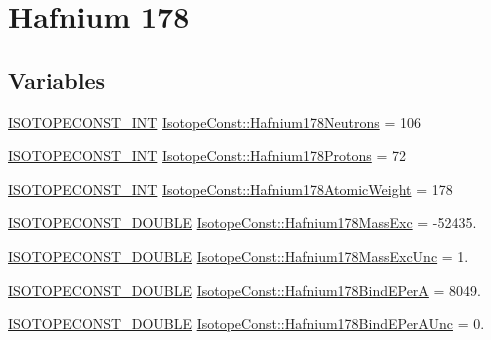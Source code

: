 \hypertarget{group___isotope_const-_hafnium-_hf178}{}\section{Hafnium 178}
\label{group___isotope_const-_hafnium-_hf178}
\subsection*{Variables}
\begin{DoxyCompactItemize}
\item 
\mbox{\hyperlink{group___isotope_const-_macros_ga5f18360b3e99483a35c32d789e62621c}{I\+S\+O\+T\+O\+P\+E\+C\+O\+N\+S\+T\+\_\+\+I\+NT}} \mbox{\hyperlink{group___isotope_const-_hafnium-_hf178_ga649bd46cdba63a0c22c6afa796c7c228}{Isotope\+Const\+::\+Hafnium178\+Neutrons}} = 106
\item 
\mbox{\hyperlink{group___isotope_const-_macros_ga5f18360b3e99483a35c32d789e62621c}{I\+S\+O\+T\+O\+P\+E\+C\+O\+N\+S\+T\+\_\+\+I\+NT}} \mbox{\hyperlink{group___isotope_const-_hafnium-_hf178_gaa981bf84e9d7c5597d189cee7db40af5}{Isotope\+Const\+::\+Hafnium178\+Protons}} = 72
\item 
\mbox{\hyperlink{group___isotope_const-_macros_ga5f18360b3e99483a35c32d789e62621c}{I\+S\+O\+T\+O\+P\+E\+C\+O\+N\+S\+T\+\_\+\+I\+NT}} \mbox{\hyperlink{group___isotope_const-_hafnium-_hf178_gac784208b1e8191cd2b9f7fa2422bd791}{Isotope\+Const\+::\+Hafnium178\+Atomic\+Weight}} = 178
\item 
\mbox{\hyperlink{group___isotope_const-_macros_ga8f45a7272ce02c0b4c65c44636ed719a}{I\+S\+O\+T\+O\+P\+E\+C\+O\+N\+S\+T\+\_\+\+D\+O\+U\+B\+LE}} \mbox{\hyperlink{group___isotope_const-_hafnium-_hf178_ga1d1aed7b2143bde015c952f37aa618b4}{Isotope\+Const\+::\+Hafnium178\+Mass\+Exc}} = -\/52435.
\item 
\mbox{\hyperlink{group___isotope_const-_macros_ga8f45a7272ce02c0b4c65c44636ed719a}{I\+S\+O\+T\+O\+P\+E\+C\+O\+N\+S\+T\+\_\+\+D\+O\+U\+B\+LE}} \mbox{\hyperlink{group___isotope_const-_hafnium-_hf178_gaaac7674e1dd055e4701fb5e870f69b46}{Isotope\+Const\+::\+Hafnium178\+Mass\+Exc\+Unc}} = 1.
\item 
\mbox{\hyperlink{group___isotope_const-_macros_ga8f45a7272ce02c0b4c65c44636ed719a}{I\+S\+O\+T\+O\+P\+E\+C\+O\+N\+S\+T\+\_\+\+D\+O\+U\+B\+LE}} \mbox{\hyperlink{group___isotope_const-_hafnium-_hf178_ga1024cf0c6cba104abcbd2cc29c85244c}{Isotope\+Const\+::\+Hafnium178\+Bind\+E\+PerA}} = 8049.
\item 
\mbox{\hyperlink{group___isotope_const-_macros_ga8f45a7272ce02c0b4c65c44636ed719a}{I\+S\+O\+T\+O\+P\+E\+C\+O\+N\+S\+T\+\_\+\+D\+O\+U\+B\+LE}} \mbox{\hyperlink{group___isotope_const-_hafnium-_hf178_ga67c961a9f4abde030c264ddb7ced5bff}{Isotope\+Const\+::\+Hafnium178\+Bind\+E\+Per\+A\+Unc}} = 0.

\end{DoxyCompactItemize}
